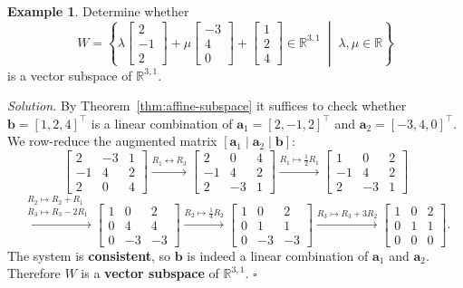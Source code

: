 \documentclass[11pt, a4paper, notitlepage]{report}
\theoremstyle{definition}
\newtheorem{example}[theorem]{Example}
\theoremstyle{remark}
\begin{document}
\begin{example}\label{ex:affine-w2-rref}
Determine whether
\[
  W = \left\{ \lambda \begin{bmatrix}2\\-1\\2\end{bmatrix} + \mu \begin{bmatrix}-3\\4\\0\end{bmatrix} + \begin{bmatrix}1\\2\\4\end{bmatrix} \in \mathbb{R}^{3,1} \;\middle|\; \lambda,\mu \in \mathbb{R} \right\}
\]
is a vector subspace of $\mathbb{R}^{3,1}$.

\emph{Solution.} By Theorem~\ref{thm:affine-subspace} it suffices to check whether $\mathbf{b} = [1,2,4]^\top$ is a linear combination of $\mathbf{a}_1 = [2,-1,2]^\top$ and $\mathbf{a}_2 = [-3,4,0]^\top$. We row-reduce the augmented matrix $[\mathbf{a}_1 \mid \mathbf{a}_2 \mid \mathbf{b}]$:
\[
  \begin{bmatrix}2&-3&1\\-1&4&2\\2&0&4\end{bmatrix}
  \xrightarrow{R_1\leftrightarrow R_3}
  \begin{bmatrix}2&0&4\\-1&4&2\\2&-3&1\end{bmatrix}
  \xrightarrow{R_1\mapsto\frac{1}{2}R_1}
  \begin{bmatrix}1&0&2\\-1&4&2\\2&-3&1\end{bmatrix}
\]
\[
  \xrightarrow{\substack{R_2\mapsto R_2+R_1\\R_3\mapsto R_3-2R_1}}
  \begin{bmatrix}1&0&2\\0&4&4\\0&-3&-3\end{bmatrix}
  \xrightarrow{R_2\mapsto\frac{1}{4}R_2}
  \begin{bmatrix}1&0&2\\0&1&1\\0&-3&-3\end{bmatrix}
  \xrightarrow{R_3\mapsto R_3+3R_2}
  \begin{bmatrix}1&0&2\\0&1&1\\0&0&0\end{bmatrix}.
\]
The system is \textbf{consistent}, so $\mathbf{b}$ is indeed a linear combination of $\mathbf{a}_1$ and $\mathbf{a}_2$. Therefore $W$ is a \textbf{vector subspace} of $\mathbb{R}^{3,1}$. $\square$
\end{example}
\end{document}
